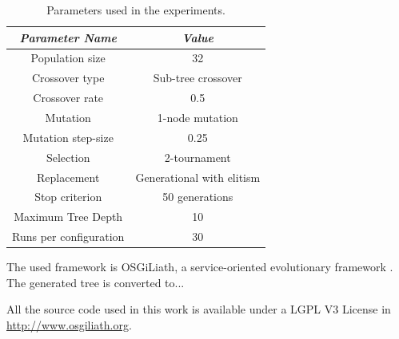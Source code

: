 \documentclass[a4paper,10pt,twocolumn,preprint,3p]{elsarticle}
\begin{document}
\begin{table}
\begin{center}
\begin{tabular}{|c|c|}
\hline
{\em Parameter Name} & {\em Value} \\\hline
Population size & 32 \\\hline
Crossover type & Sub-tree crossover \\ \hline
Crossover rate & 0.5\\ \hline
Mutation  & 1-node mutation\\ \hline
Mutation step-size & 0.25 \\ \hline
Selection & 2-tournament \\ \hline
Replacement & Generational with elitism\\ \hline
Stop criterion & 50 generations \\ \hline
Maximum Tree Depth & 10 \\ \hline %
Runs per configuration & 30 \\ \hline
\end{tabular}
\caption{Parameters used in the experiments.}
\label{tab:parameters}
\end{center}
\end{table}

The used framework is OSGiLiath, a service-oriented evolutionary
framework \cite{DBLP:journals/soco/Garcia-SanchezGCAG13}. The
generated tree is converted to...

All the source code used in this
work is available under a LGPL V3 License in
\url{http://www.osgiliath.org}. 




\end{document}
